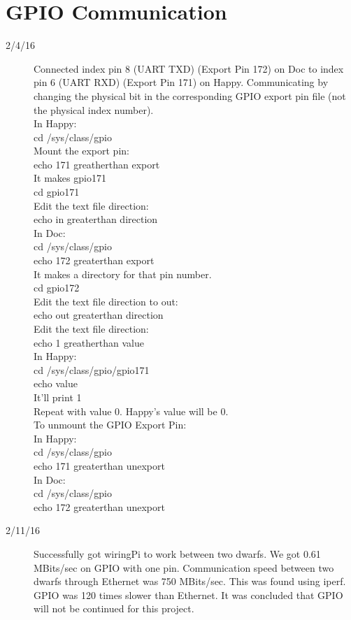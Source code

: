 \section{GPIO Communication}
\begin{description}
\item [2/4/16]  Connected index pin 8 (UART TXD) (Export Pin 172) on Doc to index pin 6 (UART RXD) (Export Pin 171) on Happy. Communicating by changing the physical bit in the corresponding GPIO export pin file (not the physical index number).  \\

In Happy: \\
cd /sys/class/gpio\\
Mount the export pin: \\
echo 171 greatherthan export\\
It makes gpio171\\
cd gpio171 \\
Edit the text file direction:\\
echo in greaterthan direction \\

In Doc: \\
cd /sys/class/gpio \\
echo 172 greaterthan export \\
It makes a directory for that pin number. \\
cd gpio172 \\
Edit the text file direction to out: \\
echo out greaterthan direction \\
Edit the text file direction: \\
echo 1 greatherthan value\\

In Happy: \\
cd /sys/class/gpio/gpio171 \\
echo value \\
It'll print 1\\

Repeat with value 0. Happy's value will be 0. \\

To unmount the GPIO Export Pin: \\
In Happy: \\
cd /sys/class/gpio \\
echo 171 greaterthan unexport \\

In Doc: \\
cd /sys/class/gpio \\
echo 172 greaterthan unexport

\item [2/11/16] Successfully got wiringPi to work between two dwarfs. We got 0.61 MBits/sec on GPIO with one pin. Communication speed between two dwarfs through Ethernet was 750 MBits/sec. This was found using iperf. GPIO was 120 times slower than Ethernet. It was concluded that GPIO will not be continued for this project.

\end{description}

